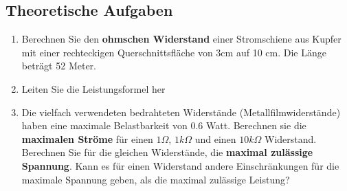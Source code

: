 \subsection{Theoretische Aufgaben}
\begin{enumerate}[$a)$]
\item Berechnen Sie den \textbf{ohmschen Widerstand} einer Stromschiene aus Kupfer mit einer rechteckigen Querschnittsfläche von 3cm auf 10 cm. Die Länge beträgt 52 Meter.
{}
\item Leiten Sie die Leistungsformel her
{}
\item Die vielfach verwendeten bedrahteten Widerstände (Metallfilmwiderstände) haben eine maximale Belastbarkeit von 0.6 Watt. Berechnen sie die \textbf{maximalen Ströme} für einen $1\Omega$, $1k\Omega$ und einen $10k\Omega$ Widerstand. Berechnen Sie für die gleichen Widerstände, die \textbf{maximal zulässige Spannung}. Kann es für einen Widerstand andere Einschränkungen für die maximale Spannung geben, als die maximal zulässige Leistung?
{}
\end{enumerate}
